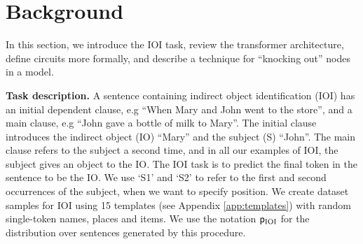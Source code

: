 





\section{Background}
\label{sec:methods}

\label{sec:task_description}
\label{sec:task}

In this section, we introduce the IOI task, review the transformer architecture, define circuits more formally, and describe a technique for ``knocking out'' nodes in a model. %


\textbf{Task description. } A sentence containing indirect object identification (IOI) has an initial dependent clause, e.g ``When Mary and John went to the store'', and a main clause, e.g ``John gave a bottle of milk to Mary''. The initial clause introduces the indirect object (IO) ``Mary'' and the subject (S) ``John''. The main clause refers to the subject a second time, and in all our examples of IOI, the subject gives an object to the IO. The IOI task is to predict the final token in the sentence to be the IO. We use ‘S1’ and ‘S2’ to refer to the first and second occurrences of the subject, when we want to specify position. We create dataset samples for IOI using 15 templates (see Appendix \ref{app:templates}) with random single-token names, places and items. We use the notation $\mathsf{p}_{\mathrm{IOI}}$ for the distribution over sentences generated by this procedure.

